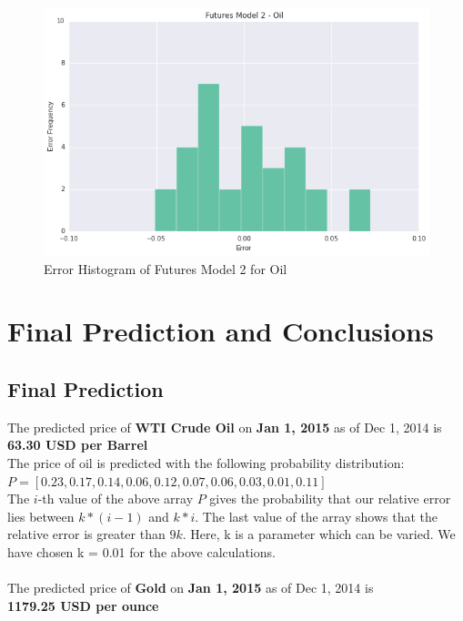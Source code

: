 \documentclass[runningheads]{llncs}
\begin{document}
\begin{figure}
\centering
\includegraphics[width=\textwidth]{futures_oil2.png}
\caption{Error Histogram of Futures Model 2 for Oil}
\label{fig:futures_oil2.png}
\end{figure}


\newpage
\section{Final Prediction and Conclusions}
\subsection {Final Prediction}
\noindent The predicted price of \textbf{WTI Crude Oil} on \textbf{Jan 1, 2015} as of Dec 1, 2014 is \\
\textbf{63.30 USD per Barrel} \\

\noindent The price of oil is predicted with the following probability distribution: \\
$P = [0.23, 0.17, 0.14, 0.06, 0.12, 0.07, 0.06, 0.03, 0.01, 0.11]$\\

The $i$-th value of the above array $P$ gives the probability that our relative error lies between $k*(i-1)$ and $k*i$. The last value of the array shows that the relative error is greater than $9k$.
Here, k is a parameter which can be varied. We have chosen k = 0.01 for the above calculations.\\\\

\noindent The predicted price of \textbf{Gold} on \textbf{Jan 1, 2015} as of Dec 1, 2014 is \\
\textbf{1179.25 USD per ounce} \\
\end{document}

